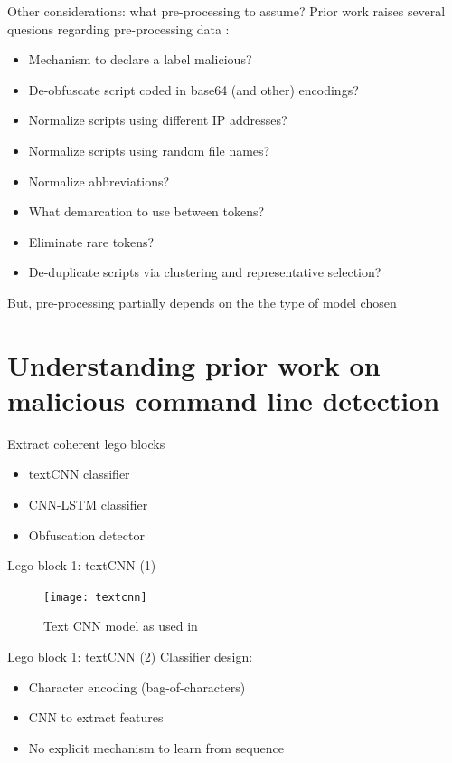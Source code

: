 \documentclass[10pt]{beamer}
\begin{document}
\begin{frame}{Other considerations: what pre-processing to assume?}
	Prior work raises several quesions regarding pre-processing data \cite{powershell2018,amsi2019,feye2018}:
	\begin{itemize}
		\item Mechanism to declare a label malicious?
		\item De-obfuscate script coded in base64 (and other) encodings?
		\item Normalize scripts using different IP addresses?
		\item Normalize scripts using random file names?
		\item Normalize abbreviations?
		\item What demarcation to use between tokens?
		\item Eliminate rare tokens?
		\item De-duplicate scripts via clustering and representative selection?
	\end{itemize}
	But, pre-processing partially depends on the the type of model chosen
\end{frame}

\section{Understanding prior work on malicious command line detection}

\begin{frame}[fragile]{Extract coherent lego blocks}
	\begin{itemize}
		\item textCNN classifier \cite{textcnn2016,textcnn2019,powershell2018}
		\item CNN-LSTM classifier \cite{amsi2019}
		\item Obfuscation detector \cite{feye2018}
	\end{itemize}
\end{frame}

\begin{frame}{Lego block 1: textCNN (1)}
	\begin{figure}
		\texttt{[image: textcnn]}
		\caption{Text CNN model as used in \cite{powershell2018}}
	\end{figure}
\end{frame}

\begin{frame}{Lego block 1: textCNN (2)}
	Classifier design:
	\begin{itemize}
		\item Character encoding (bag-of-characters)
		\item CNN to extract features
		\item No explicit mechanism to learn from sequence
	\end{itemize}
\end{frame}
\end{document}
